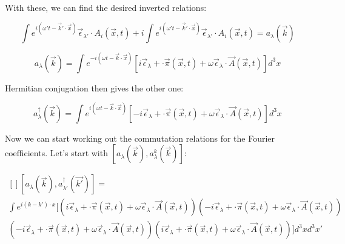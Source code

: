 \documentclass[a4]{article}
\begin{document}
    With these, we can find the desired inverted relations:

    \begin{equation}
        \int e^{i (\omega' t - \vec{k}' \cdot \vec{x})} \vec{\epsilon}_{\lambda'} \cdot A_{i} (\vec{x}, t) + i \int e^{i (\omega' t - \vec{k}' \cdot \vec{x})} \vec{\epsilon}_{\lambda'} \cdot A_{i} (\vec{x}, t) = a_{\lambda} (\vec{k})
    \end{equation}

    \begin{framed}
        \begin{equation}
            a_{\lambda} (\vec{k}) = \int e^{- i (\omega t - \vec{k} \cdot \vec{x})} [i \vec{\epsilon}_{\lambda} + \cdot \vec{\pi} (\vec{x}, t) + \omega \vec{\epsilon}_{\lambda} \cdot \vec{A} (\vec{x}, t)] d^{3} x
        \end{equation}
    \end{framed}

    Hermitian conjugation then gives the other one:

    \begin{framed}
        \begin{equation}
            a_{\lambda}^{\dagger} (\vec{k}) = \int e^{i (\omega t - \vec{k} \cdot \vec{x})} [- i \vec{\epsilon}_{\lambda} + \cdot \vec{\pi} (\vec{x}, t) + \omega \vec{\epsilon}_{\lambda} \cdot \vec{A} (\vec{x}, t)] d^{3} x
        \end{equation}
    \end{framed}

    Now we can start working out the commutation relations for the Fourier coefficients. Let's start with
    $[a_{\lambda} (\vec{k}), a^{k}_{\lambda} (\vec{k})]$:

    \begin{equation}
        \begin{aligned} []
            [a_{\lambda} (\vec{k}), a_{\lambda'}^{\dagger} (\vec{k'})] = \\
            \int e^{i (k-k') \cdot x} [(i \vec{\epsilon}_{\lambda} + \cdot \vec{\pi} (\vec{x}, t) + \omega \vec{\epsilon}_{\lambda} \cdot \vec{A} (\vec{x}, t))(- i \vec{\epsilon}_{\lambda} + \cdot \vec{\pi} (\vec{x}, t) + \omega \vec{\epsilon}_{\lambda} \cdot \vec{A} (\vec{x}, t)) \\
            (- i \vec{\epsilon}_{\lambda} + \cdot \vec{\pi} (\vec{x}, t) + \omega \vec{\epsilon}_{\lambda} \cdot \vec{A} (\vec{x}, t))(i \vec{\epsilon}_{\lambda} + \cdot \vec{\pi} (\vec{x}, t) + \omega \vec{\epsilon}_{\lambda} \cdot \vec{A} (\vec{x}, t))] d^{3} x d^{3} x'
        \end{aligned}
    \end{equation}
\end{document}
